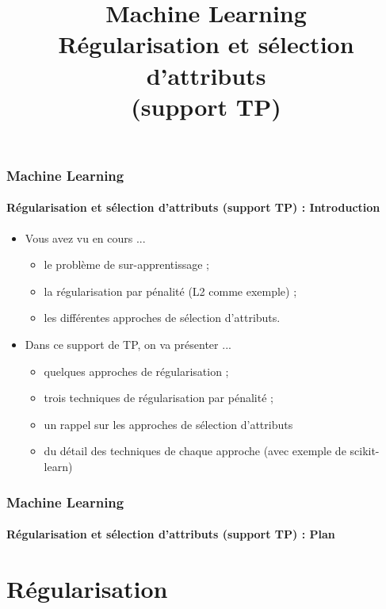 \documentclass[xcolor=table]{beamer}
\title[ML : Régularisation et sélection d'attributs (TP)] %
{Machine Learning \\Régularisation et sélection d'attributs\\(support TP)}
\begin{document}
	
\begin{frame}
	\frametitle{Machine Learning}
	\framesubtitle{Régularisation et sélection d'attributs  (support TP) : Introduction}
	
	\begin{itemize}
		\item Vous avez vu en cours ...
		\begin{itemize}
			\item le problème de sur-apprentissage ;
			\item la régularisation par pénalité (L2 comme exemple) ;
			\item les différentes approches de sélection d'attributs.
		\end{itemize}
		\item Dans ce support de TP, on va présenter ...
		\begin{itemize}
			\item quelques approches de régularisation ;
			\item trois techniques de régularisation par pénalité ;
			\item un rappel sur les approches de sélection d'attributs
			\item du détail des techniques de chaque approche (avec exemple de scikit-learn)
		\end{itemize}
	\end{itemize}
\end{frame}


\begin{frame}
	\frametitle{Machine Learning}
	\framesubtitle{Régularisation et sélection d'attributs (support TP) : Plan}
	
	\begin{multicols}{2}
		\tableofcontents
	\end{multicols}
\end{frame}

\section{Régularisation}
\end{document}
